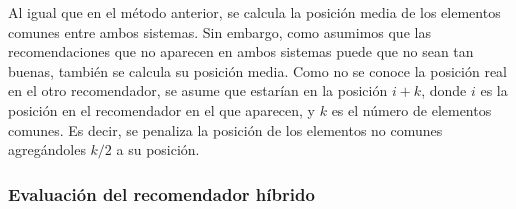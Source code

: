 Al igual que en el método anterior, se calcula la posición media de los elementos comunes entre ambos sistemas. Sin embargo, como asumimos que las recomendaciones que no aparecen en ambos sistemas puede que no sean tan buenas, también se calcula su posición media. Como no se conoce la posición real en el otro recomendador, se asume que estarían en la posición $i+k$, donde $i$ es la posición en el recomendador en el que aparecen, y $k$ es el número de elementos comunes. Es decir, se penaliza la posición de los elementos no comunes agregándoles $k/2$ a su posición.

\subsubsection{Evaluación del recomendador híbrido}

